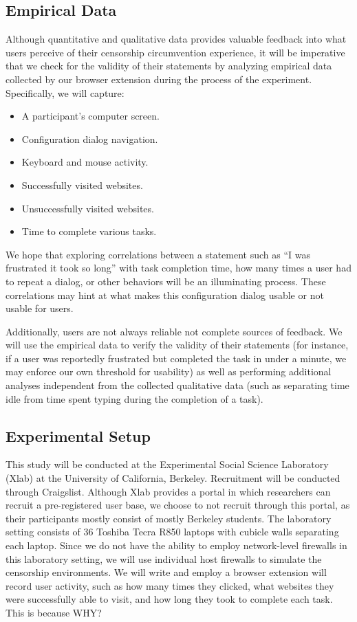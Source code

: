 \documentclass[letterpaper,twocolumn,11pt]{article}
\begin{document}
\subsection{Empirical Data} 
Although quantitative and qualitative data provides valuable feedback into what users perceive of 
their censorship circumvention experience, it will be imperative that we check for the validity of their 
statements by analyzing empirical data collected by our browser extension during the process of the
experiment. Specifically, we will capture: 

\begin{itemize} \itemsep1pt \parskip0pt 
\item A participant's computer screen. 
\item Configuration dialog navigation. 
\item Keyboard and mouse activity.
\item Successfully visited websites. 
\item Unsuccessfully visited websites. 
\item Time to complete various tasks.
\end{itemize}

We hope that exploring correlations between a statement such as  ``I was frustrated it took so long'' 
with task completion time, how many times a user had to repeat a dialog, or other behaviors 
will be an illuminating process. These correlations may hint at what makes this configuration dialog 
usable or not usable for users. 

Additionally, users are not always reliable not complete sources of feedback. We will use the 
empirical data to verify the validity of their statements (for instance, if a user was reportedly frustrated 
but completed the task in under a minute, we may enforce our own threshold for usability) as well as 
performing additional analyses independent from the collected qualitative data (such as separating time
idle from time spent typing during the completion of a task).

\subsection{Experimental Setup} 

\indent\indent This study will be conducted at the Experimental Social Science Laboratory (Xlab)
at the University of California, Berkeley. Recruitment will be conducted through Craigslist. 
Although Xlab provides a portal in which researchers can recruit a pre-registered user base,
we choose to not recruit through this portal, as their participants mostly consist of mostly Berkeley 
students. The laboratory setting consists of 36 Toshiba Tecra R850 laptops with cubicle walls 
separating each laptop. Since we do not have the ability to employ network-level firewalls in this
laboratory setting, we will use individual host firewalls to simulate the censorship environments.  
We will write and employ a browser extension will record user activity, such as how many times they 
clicked, what websites they were successfully able to visit, and how long they took to complete 
each task. {\color {red} This is because WHY?} %
\end{document}
